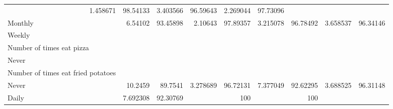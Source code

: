 \documentclass{article}
\begin{document}
\begin{tabular}{lllllllll}
  \multicolumn{1}{r}{1.458671} &
  \multicolumn{1}{r}{98.54133} &
  \multicolumn{1}{r}{3.403566} &
  \multicolumn{1}{r}{96.59643} &
  \multicolumn{1}{r}{2.269044} &
  \multicolumn{1}{r}{97.73096} \\
\multicolumn{1}{l}{\hspace{7em}Monthly} &
  \multicolumn{1}{|r}{6.54102} &
  \multicolumn{1}{r}{93.45898} &
  \multicolumn{1}{r}{2.10643} &
  \multicolumn{1}{r}{97.89357} &
  \multicolumn{1}{r}{3.215078} &
  \multicolumn{1}{r}{96.78492} &
  \multicolumn{1}{r}{3.658537} &
  \multicolumn{1}{r}{96.34146} \\
\multicolumn{1}{l}{\hspace{3em}Weekly} &
  \multicolumn{1}{|r}{} &
  \multicolumn{1}{r}{} &
  \multicolumn{1}{r}{} &
  \multicolumn{1}{r}{} &
  \multicolumn{1}{r}{} &
  \multicolumn{1}{r}{} &
  \multicolumn{1}{r}{} &
  \multicolumn{1}{r}{} \\
\multicolumn{1}{l}{\hspace{4em}Number of times eat pizza} &
  \multicolumn{1}{|r}{} &
  \multicolumn{1}{r}{} &
  \multicolumn{1}{r}{} &
  \multicolumn{1}{r}{} &
  \multicolumn{1}{r}{} &
  \multicolumn{1}{r}{} &
  \multicolumn{1}{r}{} &
  \multicolumn{1}{r}{} \\
\multicolumn{1}{l}{\hspace{5em}Never} &
  \multicolumn{1}{|r}{} &
  \multicolumn{1}{r}{} &
  \multicolumn{1}{r}{} &
  \multicolumn{1}{r}{} &
  \multicolumn{1}{r}{} &
  \multicolumn{1}{r}{} &
  \multicolumn{1}{r}{} &
  \multicolumn{1}{r}{} \\
\multicolumn{1}{l}{\hspace{6em}Number of times eat fried potatoes} &
  \multicolumn{1}{|r}{} &
  \multicolumn{1}{r}{} &
  \multicolumn{1}{r}{} &
  \multicolumn{1}{r}{} &
  \multicolumn{1}{r}{} &
  \multicolumn{1}{r}{} &
  \multicolumn{1}{r}{} &
  \multicolumn{1}{r}{} \\
\multicolumn{1}{l}{\hspace{7em}Never} &
  \multicolumn{1}{|r}{10.2459} &
  \multicolumn{1}{r}{89.7541} &
  \multicolumn{1}{r}{3.278689} &
  \multicolumn{1}{r}{96.72131} &
  \multicolumn{1}{r}{7.377049} &
  \multicolumn{1}{r}{92.62295} &
  \multicolumn{1}{r}{3.688525} &
  \multicolumn{1}{r}{96.31148} \\
\multicolumn{1}{l}{\hspace{7em}Daily} &
  \multicolumn{1}{|r}{7.692308} &
  \multicolumn{1}{r}{92.30769} &
  \multicolumn{1}{r}{} &
  \multicolumn{1}{r}{100} &
  \multicolumn{1}{r}{} &
  \multicolumn{1}{r}{100} &

\end{tabular}
\end{document}
